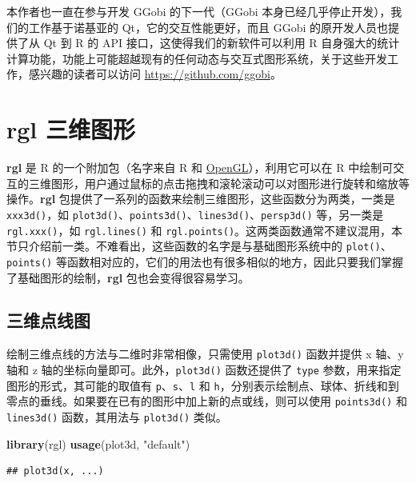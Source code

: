 \documentclass[
  b5paper,
  UTF8,twoside]{book}
\newenvironment{Shaded}{\begin{snugshade}}{\end{snugshade}}
\newcommand{\FunctionTok}[1]{\textcolor[rgb]{0.13,0.29,0.53}{\textbf{#1}}}
\newcommand{\NormalTok}[1]{#1}
\newcommand{\StringTok}[1]{\textcolor[rgb]{0.31,0.60,0.02}{#1}}
\begin{document}
本作者也一直在参与开发 GGobi 的下一代（GGobi 本身已经几乎停止开发），我们的工作基于诺基亚的 Qt，它的交互性能更好，而且 GGobi 的原开发人员也提供了从 Qt 到 R 的 API 接口，这使得我们的新软件可以利用 R 自身强大的统计计算功能，功能上可能超越现有的任何动态与交互式图形系统，关于这些开发工作，感兴趣的读者可以访问 \url{https://github.com/ggobi}。

\section{rgl 三维图形}\label{sec:rgl}

\textbf{rgl} 是 R 的一个附加包（名字来自 R 和 \href{https://www.opengl.org/}{OpenGL}），利用它可以在 R 中绘制可交互的三维图形，用户通过鼠标的点击拖拽和滚轮滚动可以对图形进行旋转和缩放等操作。\textbf{rgl} 包提供了一系列的函数来绘制三维图形，这些函数分为两类，一类是 \texttt{xxx3d()}，如 \texttt{plot3d()}、\texttt{points3d()}、\texttt{lines3d()}、\texttt{persp3d()} 等，另一类是 \texttt{rgl.xxx()}，如 \texttt{rgl.lines()} 和 \texttt{rgl.points()}。这两类函数通常不建议混用，本节只介绍前一类。不难看出，这些函数的名字是与基础图形系统中的 \texttt{plot()}、\texttt{points()} 等函数相对应的，它们的用法也有很多相似的地方，因此只要我们掌握了基础图形的绘制，\textbf{rgl} 包也会变得很容易学习。

\subsection{三维点线图}\label{ux4e09ux7ef4ux70b9ux7ebfux56fe}

绘制三维点线的方法与二维时非常相像，只需使用 \texttt{plot3d()} 函数并提供 x 轴、y 轴和 z 轴的坐标向量即可。此外，\texttt{plot3d()} 函数还提供了 \texttt{type} 参数，用来指定图形的形式，其可能的取值有 \texttt{p}、\texttt{s}、\texttt{l} 和 \texttt{h}，分别表示绘制点、球体、折线和到零点的垂线。如果要在已有的图形中加上新的点或线，则可以使用 \texttt{points3d()} 和 \texttt{lines3d()} 函数，其用法与 \texttt{plot3d()} 类似。

\begin{Shaded}
\begin{Highlighting}[]
\FunctionTok{library}\NormalTok{(rgl)}
\FunctionTok{usage}\NormalTok{(plot3d, }\StringTok{"default"}\NormalTok{)}
\end{Highlighting}
\end{Shaded}

\begin{verbatim}
## plot3d(x, ...)
\end{verbatim}
\end{document}
